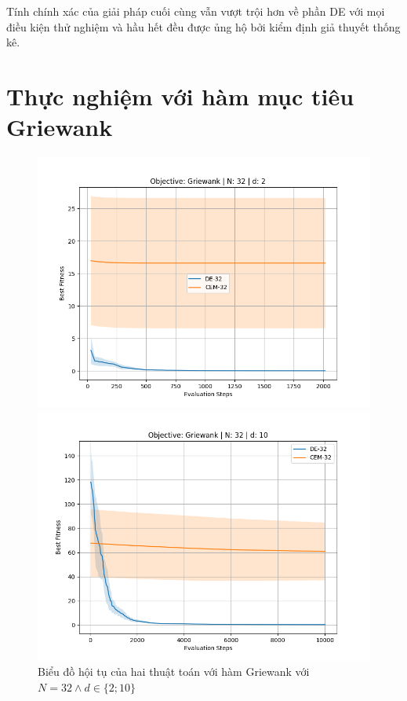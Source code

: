 \documentclass[10pt]{report}
\begin{document}
Tính chính xác của giải pháp cuối cùng vẫn vượt trội hơn về phần DE với mọi điều kiện thử nghiệm và hầu hết đều được ủng hộ bởi kiểm định giả thuyết thống kê.

\section{Thực nghiệm với hàm mục tiêu Griewank}
\begin{figure}[H]\centering
	\caption{Biểu đồ hội tụ của hai thuật toán với hàm Griewank với \(N = 32 \wedge d \in \{2; 10\}\)}
	\begin{minipage}{0.45\textwidth}\centering
		\includegraphics[width=\textwidth]{../assets/graphs/objective=Griewank_N=32_d=2.png}
	\end{minipage}
	\begin{minipage}{0.45\textwidth}\centering
		\includegraphics[width=\textwidth]{../assets/graphs/objective=Griewank_N=32_d=10.png}
	\end{minipage}
\end{figure}
\end{document}
